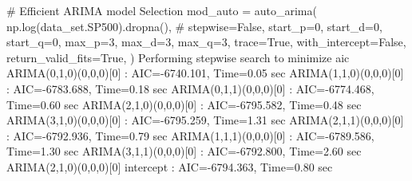 # Efficient ARIMA model Selection
mod_auto = auto_arima(
    np.log(data_set.SP500).dropna(),  # stepwise=False,
    start_p=0,
    start_d=0,
    start_q=0,
    max_p=3,
    max_d=3,
    max_q=3,
    trace=True,
    with_intercept=False,
    return_valid_fits=True,
)
Performing stepwise search to minimize aic
 ARIMA(0,1,0)(0,0,0)[0]             : AIC=-6740.101, Time=0.05 sec
 ARIMA(1,1,0)(0,0,0)[0]             : AIC=-6783.688, Time=0.18 sec
 ARIMA(0,1,1)(0,0,0)[0]             : AIC=-6774.468, Time=0.60 sec
 ARIMA(2,1,0)(0,0,0)[0]             : AIC=-6795.582, Time=0.48 sec
 ARIMA(3,1,0)(0,0,0)[0]             : AIC=-6795.259, Time=1.31 sec
 ARIMA(2,1,1)(0,0,0)[0]             : AIC=-6792.936, Time=0.79 sec
 ARIMA(1,1,1)(0,0,0)[0]             : AIC=-6789.586, Time=1.30 sec
 ARIMA(3,1,1)(0,0,0)[0]             : AIC=-6792.800, Time=2.60 sec
 ARIMA(2,1,0)(0,0,0)[0] intercept   : AIC=-6794.363, Time=0.80 sec

